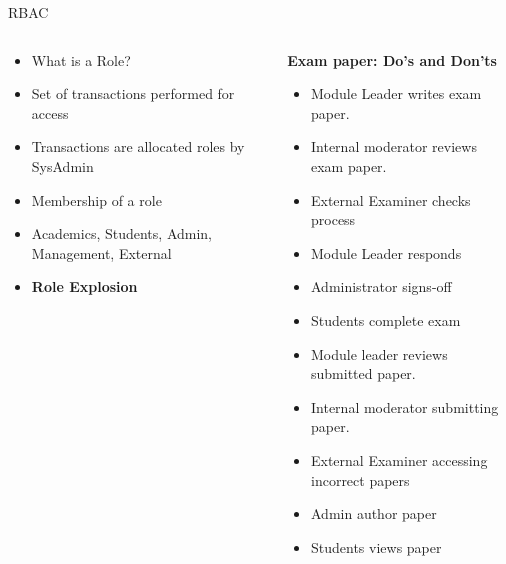 \documentclass[pdf,table]{beamer}
\begin{document}
\begin{frame}{RBAC}
	\begin{columns}[T]
		\begin{column}{0.48\textwidth}
			\begin{itemize}
				\item What is a Role?
				\item Set of transactions performed for access
				\item Transactions are allocated roles by SysAdmin
				\item Membership of a role
				\item Academics, Students, Admin, Management, External 
				\item<2-> {\bf Role Explosion}
			\end{itemize}
		\end{column}
		\begin{column}{0.48\textwidth}
			{\bf Exam paper: Do's and Don'ts \cite{mitchell:2019a}}
			\begin{itemize}
				\item<1|only@1> Module Leader writes exam paper.
				\item<1|only@1> Internal moderator reviews exam paper.
				\item<1|only@1> External Examiner checks process
				\item<1|only@1> Module Leader responds
				\item<1|only@1> Administrator signs-off
				\item<1|only@1> Students complete exam
				
				\item<2|only@2> Module leader reviews submitted paper.
				\item<2|only@2> Internal moderator submitting paper.
				\item<2|only@2> External Examiner accessing incorrect papers
				\item<2|only@2> Admin author paper
				\item<2|only@2> Students views paper
			\end{itemize}
		\end{column}
	\end{columns}	
\end{frame}
\end{document}
